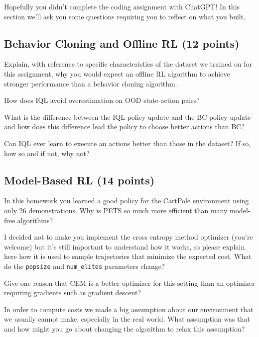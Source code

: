 \documentclass[letterpaper,12pt,addpoints]{exam}
\begin{document}
Hopefully you didn't complete the coding assignment with ChatGPT! In this section we'll ask you some questions requiring you to reflect on what you built.

\subsection{Behavior Cloning and Offline RL (12 points)}
\begin{questions}
    \question[3] Explain, with reference to specific characteristics of the dataset we trained on for this assignment, why you would expect an offline RL algorithm to achieve stronger performance than a behavior cloning algorithm.



    \question[3] How does IQL avoid overestimation on OOD state-action pairs?



    \question[3] What is the difference between the IQL policy update and the BC policy update and how does this difference lead the policy to choose better actions than BC?



    \question[3] Can IQL ever learn to execute an actions better than those in the dataset? If so, how so and if not, why not?
    

    
\end{questions}

\subsection{Model-Based RL (14 points)}
\begin{questions}
    \question[3] In this homework you learned a good policy for the CartPole environment using only 26 demonstrations. Why is PETS so much more efficient than many model-free algorithms?


    
    \question[5] I decided not to make you implement the cross entropy method optimizer (you're welcome) but it's still important to understand how it works, so please explain here how it is used to sample trajectories that minimize the expected cost. What do the \texttt{popsize} and \texttt{num\_elites} parameters change?
    


    \question[3] Give one reason that CEM is a better optimizer for this setting than an optimizer requiring gradients such as gradient descent?


    
    \question[3] In order to compute costs we made a big assumption about our environment that we usually cannot make, especially in the real world. What assumption was that and how might you go about changing the algorithm to relax this assumption?
    




    
\end{questions}
\end{document}
